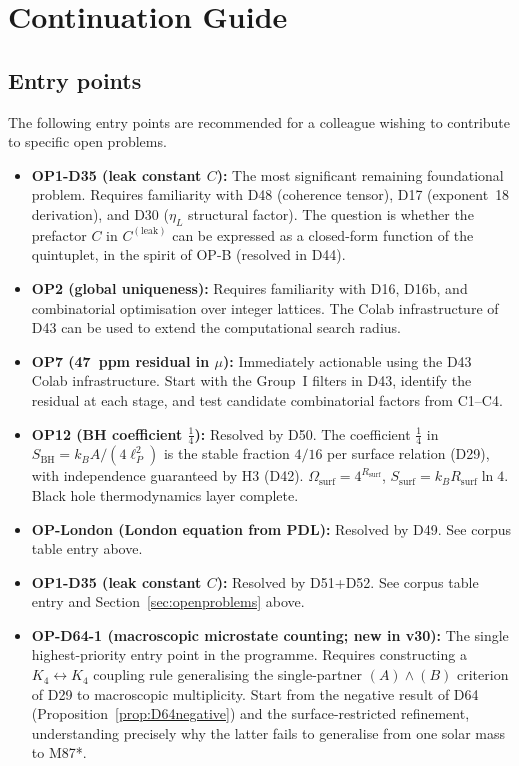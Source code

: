 \documentclass[11pt,a4paper]{article}
\theoremstyle{plain}
\theoremstyle{definition}
\theoremstyle{remark}
\newcommand{\Rsurf}{R_{\mathrm{surf}}}
\newcommand{\SBH}{S_{\mathrm{BH}}}
\begin{document}
\section{Continuation Guide}
\label{sec:continuation}

\subsection{Entry points}
\label{subsec:entrypoints}
The following entry points are recommended for a colleague wishing to contribute to specific open problems.

\begin{itemize}
\item \textbf{OP1-D35 (leak constant $C$):} The most significant remaining foundational problem. Requires familiarity with D48 (coherence tensor), D17 (exponent~18 derivation), and D30 ($\eta_L$ structural factor). The question is whether the prefactor $C$ in $C^{(\mathrm{leak})}$ can be expressed as a closed-form function of the quintuplet, in the spirit of OP-B (resolved in D44).
\item \textbf{OP2 (global uniqueness):} Requires familiarity with D16, D16b, and combinatorial optimisation over integer lattices. The Colab infrastructure of D43 can be used to extend the computational search radius.
\item \textbf{OP7 (47~ppm residual in $\mu$):} Immediately actionable using the D43 Colab infrastructure. Start with the Group~I filters in D43, identify the residual at each stage, and test candidate combinatorial factors from C1--C4.
\item \textbf{OP12 (BH coefficient $\tfrac{1}{4}$):} \textcolor{proofblue}{Resolved by D50.} The coefficient $\tfrac{1}{4}$ in $\SBH = k_B A/(4\ell_P^2)$ is the stable fraction $4/16$ per surface relation (D29), with independence guaranteed by H3 (D42). $\Omega_{\mathrm{surf}} = 4^{\Rsurf}$, $S_{\mathrm{surf}} = k_B\Rsurf\ln 4$. Black hole thermodynamics layer complete.
\item \textbf{OP-London (London equation from PDL):} \textcolor{proofblue}{Resolved by D49.} See corpus table entry above.
\item \textbf{OP1-D35 (leak constant $C$):} \textcolor{proofblue}{Resolved by D51+D52.} See corpus table entry and Section~\ref{sec:openproblems} above.
\item \textbf{OP-D64-1 (macroscopic microstate counting; new in v30):} The single highest-priority entry point in the programme. Requires constructing a $K_4\leftrightarrow K_4$ coupling rule generalising the single-partner $(A)\wedge(B)$ criterion of D29 to macroscopic multiplicity. Start from the negative result of D64 (Proposition~\ref{prop:D64negative}) and the surface-restricted refinement, understanding precisely why the latter fails to generalise from one solar mass to M87*.

\end{itemize}
\end{document}
